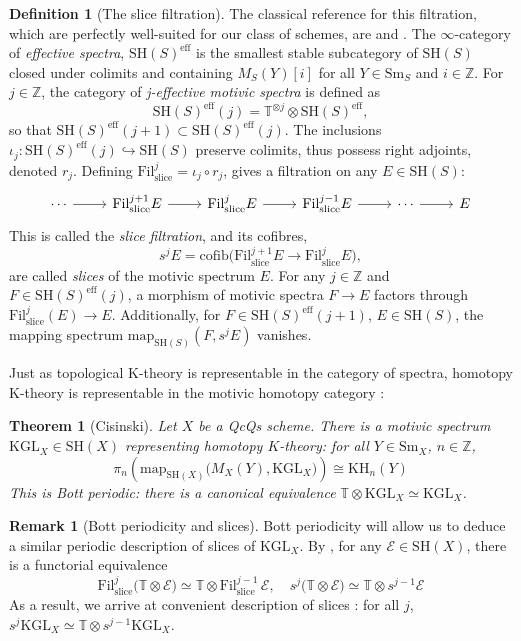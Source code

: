 \documentclass[11pt, twoside]{article}
\numberwithin{equation}{section}
\newtheorem{theorem}[equation]{Theorem}
\theoremstyle{definition}
\newtheorem{definition}[equation]{Definition}
\newtheorem{remark}[equation]{Remark}
\newcommand{\bb}[1]{\mathbb{#1}}
\newcommand{\map}{\mathrm{map}}
\newcommand{\fil}{\mathrm{Fil}}
\newcommand{\Kgl}{\mathrm{KGL}}
\newcommand{\sh}{\mathrm{SH}}
\newcommand{\sm}{\mathrm{Sm}}
\newcommand{\sli}{\mathrm{slice}}
\newcommand{\KH}{\mathrm{KH}}
\newcommand{\K}{\mathrm{K}}
\begin{document}
\begin{definition}[The slice filtration]
The classical reference for this filtration, which are perfectly well-suited for our class of schemes, are \cite{VSli1} and \cite{VSli2}. The \(\infty\)-category of \textit{effective spectra}, \(\sh(S)^\mathrm{eff}\) is the smallest stable subcategory of \(\sh(S)\) closed under colimits and containing \(M_S(Y)[i]\) for all \(Y \in \sm_S\) and \(i \in \bb{Z}\). For \(j \in \bb{Z}\), the category of \textit{j-effective motivic spectra} is defined as 
\[\sh(S)^\mathrm{eff}(j) = \bb{T}^{\otimes j} \otimes \sh(S)^\mathrm{eff},\]
so that \(\sh(S)^\mathrm{eff}(j + 1) \subset \sh(S)^\mathrm{eff}(j)\). The inclusions \(\iota_j \colon \sh(S)^\mathrm{eff}(j) \hookrightarrow \sh(S)\) preserve colimits, thus possess right adjoints, denoted \(r_j\). Defining \(\fil_\sli^j = \iota_j \circ r_j\), gives a filtration on any \(E \in \sh(S)\): 
\[\begin{tikzcd} \cdots \ar[r] & \fil_\sli^{j + 1} E \ar[r] & \fil_\sli^j E \ar[r] & \fil_\sli^{j - 1} E \ar[r] & \cdots \ar[r] & E \end{tikzcd}\]
This is called the \textit{slice filtration}, and its cofibres, 
\[s^j E = \mathrm{cofib}\big(\fil_\sli^{j + 1} E \to \fil_\sli^j E\big),\]
are called \emph{slices} of the motivic spectrum \(E\). For any \(j \in \bb{Z}\) and \(F \in \sh(S)^\mathrm{eff}(j)\), a morphism of motivic spectra \(F \to E\) factors through \(\fil_\sli^j(E) \to E\). Additionally, for \(F \in \sh(S)^\mathrm{eff}(j + 1)\), \(E \in \sh(S)\), the mapping spectrum \(\map_{\sh(S)}(F, s^jE)\) vanishes.
\end{definition}

Just as topological \(\K\)-theory is representable in the category of spectra, homotopy \(\K\)-theory is representable in the motivic homotopy category \cite{Cis}: 

\begin{theorem}[Cisinski]
Let \(X\) be a QcQs scheme. There is a motivic spectrum \(\Kgl_X \in \sh(X)\) representing homotopy \(K\)-theory: for all \(Y \in \sm_X\), \(n \in \bb{Z}\), 
\[\pi_n \! \left(\map_{\sh(X)}\big(M_X(Y), \Kgl_X\big)\right) \cong \KH_n(Y)\]
This is \emph{Bott periodic}: there is a canonical equivalence \(\bb{T} \otimes \Kgl_X \simeq \Kgl_X\).

\end{theorem}

\begin{remark}[Bott periodicity and slices]
Bott periodicity will allow us to deduce a similar periodic description of slices of \(\Kgl_X\). By \cite[Lemma 2.1]{RonOst}, for any \(\mathcal{E} \in \sh(X)\), there is a functorial equivalence 
\[\fil_\sli^j \big(\bb{T} \otimes \mathcal{E}\big) \simeq \bb{T} \otimes \fil_\sli^{j - 1} \, \mathcal{E}, \quad s^j \big(\bb{T} \otimes \mathcal{E}\big) \simeq \bb{T} \otimes s^{j - 1} \mathcal{E}\]
As a result, we arrive at convenient description of slices : for all \(j\), \(s^j \Kgl_X \simeq \bb{T} \otimes s^{j - 1} \Kgl_X\).
\end{remark}
\end{document}
